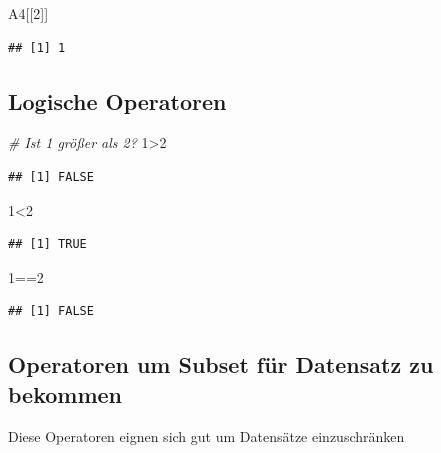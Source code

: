 \documentclass[]{article}
\newenvironment{Shaded}{\begin{snugshade}}{\end{snugshade}}
\newcommand{\DecValTok}[1]{\textcolor[rgb]{0.00,0.00,0.81}{{#1}}}
\newcommand{\CommentTok}[1]{\textcolor[rgb]{0.56,0.35,0.01}{\textit{{#1}}}}
\newcommand{\NormalTok}[1]{{#1}}
\begin{document}
\begin{Shaded}
\begin{Highlighting}[]
\NormalTok{A4[[}\DecValTok{2}\NormalTok{]]}
\end{Highlighting}
\end{Shaded}

\begin{verbatim}
## [1] 1
\end{verbatim}

\subsection{Logische Operatoren}\label{logische-operatoren}

\begin{Shaded}
\begin{Highlighting}[]
\CommentTok{# Ist 1 größer als 2?}
\DecValTok{1}\NormalTok{>}\DecValTok{2}
\end{Highlighting}
\end{Shaded}

\begin{verbatim}
## [1] FALSE
\end{verbatim}

\begin{Shaded}
\begin{Highlighting}[]
\DecValTok{1}\NormalTok{<}\DecValTok{2}
\end{Highlighting}
\end{Shaded}

\begin{verbatim}
## [1] TRUE
\end{verbatim}

\begin{Shaded}
\begin{Highlighting}[]
\DecValTok{1}\NormalTok{==}\DecValTok{2}
\end{Highlighting}
\end{Shaded}

\begin{verbatim}
## [1] FALSE
\end{verbatim}

\subsection{Operatoren um Subset für Datensatz zu
bekommen}\label{operatoren-um-subset-fur-datensatz-zu-bekommen}

Diese Operatoren eignen sich gut um Datensätze einzuschränken
\end{document}
